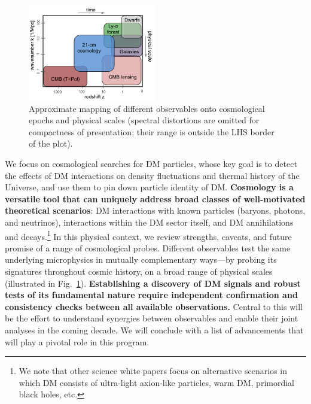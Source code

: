 \documentclass[12pt]{article}
\begin{document}
\begin{figure}
\begin{center}
\vspace{-0.9cm}
\includegraphics[width=0.5\textwidth]{scales.png}
\end{center}
\vspace{-0.8cm}
\caption{Approximate mapping of different observables onto cosmological epochs and physical scales (spectral distortions are omitted for compactness of presentation; their range is outside the LHS border of the plot).}
\vspace{-0.1cm}
\label{fig:scales}
\end{figure}
We focus on cosmological searches for DM particles, whose key goal is to detect the effects of DM interactions on density fluctuations and thermal history of the Universe, and use them to pin down particle identity of DM.
\textbf{Cosmology is a versatile tool that can uniquely address broad classes of well-motivated theoretical scenarios}: DM interactions with known particles (baryons, photons, and neutrinos), interactions within the DM sector itself, and DM annihilations and decays.\footnote{We note that other science white papers focus on alternative scenarios in which DM consists of ultra-light axion-like particles, warm DM, primordial black holes, etc.}
In this physical context, we review strengths, caveats, and future promise of a range of cosmological probes.
{Different observables test the same underlying microphysics in mutually complementary ways---by probing its signatures throughout cosmic history, on a broad range of physical scales} (illustrated in Fig.~\ref{fig:scales}).
\textbf{Establishing a discovery of DM signals and robust tests of its fundamental nature require independent confirmation and consistency checks between all available observations.}
Central to this will be the effort to understand synergies between observables and enable their joint analyses in the coming decade.
We will conclude with a list of advancements that will play a pivotal role in this program.
\end{document}
